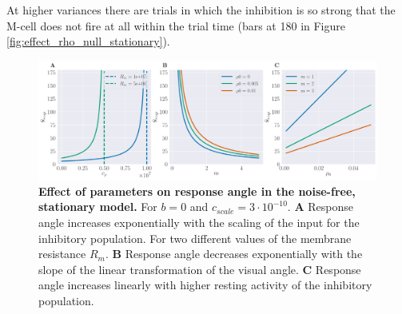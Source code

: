 \documentclass[a4paper,10pt,hidelinks]{scrreprt}
\begin{document}
    At higher variances there are trials in which the inhibition is so strong that the M-cell does not fire at all within the trial time (bars at 180\textdegree{} in Figure \ref{fig:effect_rho_null_stationary}).
    \begin{figure}[H]
    	\begin{center}
			\includegraphics[width=\textwidth]{figure_stationary_params.pdf}
    	\end{center}
    	\caption{\textbf{Effect of parameters on response angle in the noise-free, stationary model.}  For $b=0$ and $c_{scale}=3\cdot10^{-10}$. \textbf{A} Response angle increases exponentially with the scaling of the input for the inhibitory population. For two different values of the membrane resistance $R_{m}$. \textbf{B} Response angle decreases exponentially with the slope of the linear transformation of the visual angle. \textbf{C} Response angle increases linearly with higher resting activity of the inhibitory population.}
    	\label{fig:effect_stationary_params}
    \end{figure}
    
\end{document}
